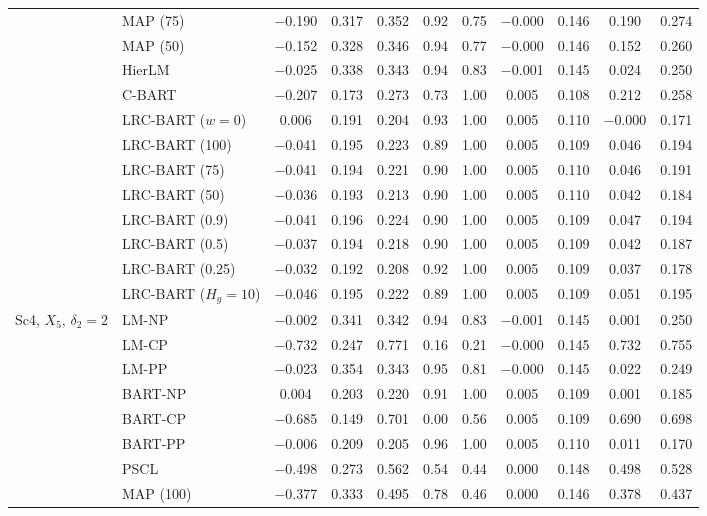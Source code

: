 \documentclass[11pt]{article}
\theoremstyle{definition}
\theoremstyle{plain}
\begin{document}
\begin{center}
\begin{longtable}{llccccccccc}
& MAP (75) & $-$0.190 & 0.317 & 0.352 & 0.92 & 0.75 & $-$0.000 & 0.146 & 0.190 & 0.274 \\
& MAP (50) & $-$0.152 & 0.328 & 0.346 & 0.94 & 0.77 & $-$0.000 & 0.146 & 0.152 & 0.260 \\
& HierLM & $-$0.025 & 0.338 & 0.343 & 0.94 & 0.83 & $-$0.001 & 0.145 & 0.024 & 0.250 \\
& C-BART & $-$0.207 & 0.173 & 0.273 & 0.73 & 1.00 & 0.005 & 0.108 & 0.212 & 0.258 \\
& LRC-BART ($w=0$) & 0.006 & 0.191 & 0.204 & 0.93 & 1.00 & 0.005 & 0.110 & $-$0.000 & 0.171 \\
& LRC-BART (100) & $-$0.041 & 0.195 & 0.223 & 0.89 & 1.00 & 0.005 & 0.109 & 0.046 & 0.194 \\
& LRC-BART (75) & $-$0.041 & 0.194 & 0.221 & 0.90 & 1.00 & 0.005 & 0.110 & 0.046 & 0.191 \\
& LRC-BART (50) & $-$0.036 & 0.193 & 0.213 & 0.90 & 1.00 & 0.005 & 0.110 & 0.042 & 0.184 \\
& LRC-BART (0.9) & $-$0.041 & 0.196 & 0.224 & 0.90 & 1.00 & 0.005 & 0.109 & 0.047 & 0.194 \\
& LRC-BART (0.5) & $-$0.037 & 0.194 & 0.218 & 0.90 & 1.00 & 0.005 & 0.109 & 0.042 & 0.187 \\
& LRC-BART (0.25) & $-$0.032 & 0.192 & 0.208 & 0.92 & 1.00 & 0.005 & 0.109 & 0.037 & 0.178 \\
& LRC-BART ($H_g=10$) & $-$0.046 & 0.195 & 0.222 & 0.89 & 1.00 & 0.005 & 0.109 & 0.051 & 0.195 \\
\midrule
\multirow{20}{*}{Sc4, $X_5$, $\delta_2=2$} & LM-NP & $-$0.002 & 0.341 & 0.342 & 0.94 & 0.83 & $-$0.001 & 0.145 & 0.001 & 0.250 \\
& LM-CP & $-$0.732 & 0.247 & 0.771 & 0.16 & 0.21 & $-$0.000 & 0.145 & 0.732 & 0.755 \\
& LM-PP & $-$0.023 & 0.354 & 0.343 & 0.95 & 0.81 & $-$0.000 & 0.145 & 0.022 & 0.249 \\
& BART-NP & 0.004 & 0.203 & 0.220 & 0.91 & 1.00 & 0.005 & 0.109 & 0.001 & 0.185 \\
& BART-CP & $-$0.685 & 0.149 & 0.701 & 0.00 & 0.56 & 0.005 & 0.109 & 0.690 & 0.698 \\
& BART-PP & $-$0.006 & 0.209 & 0.205 & 0.96 & 1.00 & 0.005 & 0.110 & 0.011 & 0.170 \\
& PSCL & $-$0.498 & 0.273 & 0.562 & 0.54 & 0.44 & 0.000 & 0.148 & 0.498 & 0.528 \\
& MAP (100) & $-$0.377 & 0.333 & 0.495 & 0.78 & 0.46 & 0.000 & 0.146 & 0.378 & 0.437 \\

\end{longtable}
\end{center}
\end{document}
